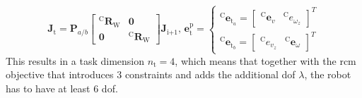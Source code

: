 \begin{equation}
    \mathbf{J}_\text{t} = \mathbf{P}_{a/b} \begin{bmatrix}^\text{C}\mathbf{R}_\text{W} & \mathbf{0} \\ \mathbf{0} & ^\text{C}\mathbf{R}_\text{W}\end{bmatrix}\mathbf{J}_\text{i+1},\,
    \mathbf{e}^\text{p}_\text{t} = 
    \begin{cases}
        ^\text{C}\mathbf{e}_{\text{t}_a}=\begin{bmatrix}^\text{C}\mathbf{e}_v & ^\text{C}e_{\omega_z} \end{bmatrix}^T \\
        ^\text{C}\mathbf{e}_{\text{t}_b}=\begin{bmatrix}^\text{C}e_{v_z} & ^\text{C}\mathbf{e}_{\omega} \end{bmatrix}^T
    \end{cases}
\end{equation}
This results in a task dimension $n_\text{t} = 4$, which means that together with the \gls{rcm} objective that introduces 3 constraints and adds the additional \gls{dof} $\lambda$, the robot has to have at least 6 \gls{dof}.

